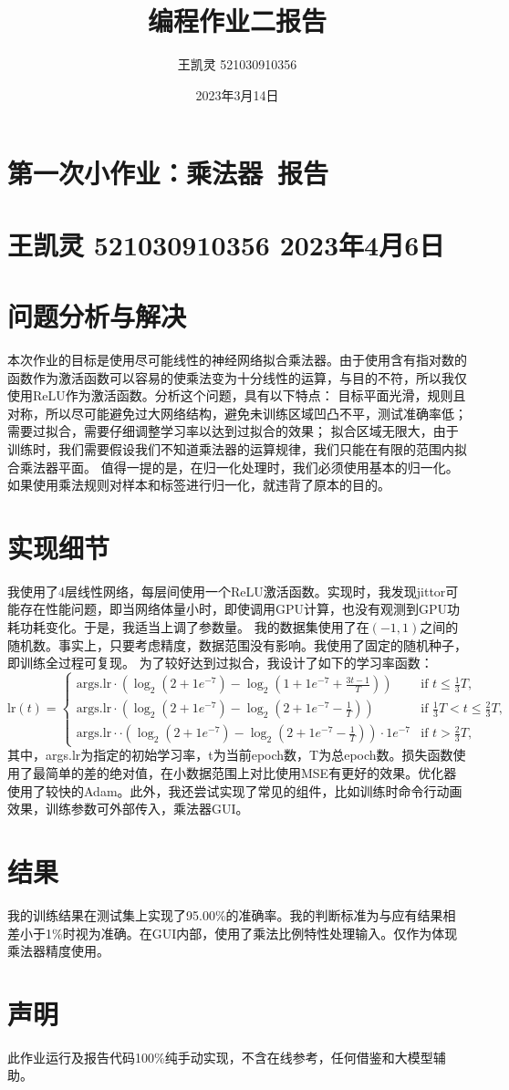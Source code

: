\documentclass[a4paper]{article}
\title{编程作业二报告}
\author{王凯灵 521030910356}
\date{2023年3月14日}
\begin{document}
	\section*{\Huge 第一次小作业：乘法器~报告}
	\section*{\small 王凯灵 521030910356 2023年4月6日}
	\section*{问题分析与解决}
	本次作业的目标是使用尽可能线性的神经网络拟合乘法器。由于使用含有指对数的函数作为激活函数可以容易的使乘法变为十分线性的运算，与目的不符，所以我仅使用ReLU作为激活函数。分析这个问题，具有以下特点：
	目标平面光滑，规则且对称，所以尽可能避免过大网络结构，避免未训练区域凹凸不平，测试准确率低；
	需要过拟合，需要仔细调整学习率以达到过拟合的效果；
	拟合区域无限大，由于训练时，我们需要假设我们不知道乘法器的运算规律，我们只能在有限的范围内拟合乘法器平面。
	值得一提的是，在归一化处理时，我们必须使用基本的归一化。如果使用乘法规则对样本和标签进行归一化，就违背了原本的目的。
	
	\section*{实现细节}
	我使用了4层线性网络，每层间使用一个ReLU激活函数。实现时，我发现jittor可能存在性能问题，即当网络体量小时，即使调用GPU计算，也没有观测到GPU功耗功耗变化。于是，我适当上调了参数量。
	我的数据集使用了在$(-1,1)$之间的随机数。事实上，只要考虑精度，数据范围没有影响。我使用了固定的随机种子，即训练全过程可复现。
	为了较好达到过拟合，我设计了如下的学习率函数：
	\begin{equation}
		\mathrm{lr}(t) =
		\begin{cases}
			\mathrm{args.lr} \cdot \left(\log_2\left(2 + 1e^{-7}\right) - \log_2\left(1 + 1e^{-7} + \frac{3t-1}{T}\right)\right) & \text{if } t \leq \frac{1}{3}T, \\
			\mathrm{args.lr} \cdot \left(\log_2\left(2 + 1e^{-7}\right) - \log_2\left(2 + 1e^{-7} - \frac{1}{T}\right)\right) & \text{if } \frac{1}{3}T < t \leq \frac{2}{3}T, \\
			\mathrm{args.lr} \cdot \cdot \left(\log_2\left(2 + 1e^{-7}\right) - \log_2\left(2 + 1e^{-7} - \frac{1}{T}\right)\right) \cdot 1e^{-7} & \text{if } t > \frac{2}{3}T,
		\end{cases}
	\end{equation}
	其中，args.lr为指定的初始学习率，t为当前epoch数，T为总epoch数。损失函数使用了最简单的差的绝对值，在小数据范围上对比使用MSE有更好的效果。优化器使用了较快的Adam。此外，我还尝试实现了常见的组件，比如训练时命令行动画效果，训练参数可外部传入，乘法器GUI。
	\section*{结果}
	我的训练结果在测试集上实现了95.00\%的准确率。我的判断标准为与应有结果相差小于1\%时视为准确。在GUI内部，使用了乘法比例特性处理输入。仅作为体现乘法器精度使用。
	\section*{声明}
	此作业运行及报告代码100\%纯手动实现，不含在线参考，任何借鉴和大模型辅助。
\end{document}

